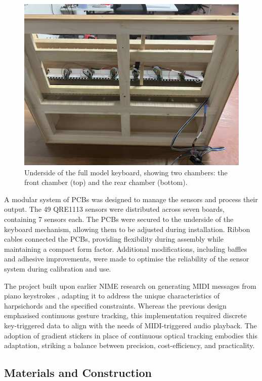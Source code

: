 \begin{figure}  
  \centering
  \includegraphics[width=\linewidth]{src/images/49-key-bottom-sensors-no-keys.jpg} 
  \caption{Underside of the full model keyboard, showing two chambers: the front chamber (top) and the rear chamber (bottom).} 
  \Description{} 
  \label{fig:49-key-bottom}
\end{figure}

A modular system of PCBs was designed to manage the sensors and process their output. The 49 QRE1113 sensors were distributed across seven boards, containing 7 sensors each. The PCBs were secured to the underside of the keyboard mechanism, allowing them to be adjusted during installation. Ribbon cables connected the PCBs, providing flexibility during assembly while maintaining a compact form factor. Additional modifications, including baffles and adhesive improvements, were made to optimise the reliability of the sensor system during calibration and use.


The project built upon earlier NIME research on generating MIDI messages from piano keystrokes \cite{McPherson2013}, adapting it to address the unique characteristics of harpsichords and the specified constraints. Whereas the previous design emphasised continuous gesture tracking, this implementation required discrete key-triggered data to align with the needs of MIDI-triggered audio playback. The adoption of gradient stickers in place of continuous optical tracking embodies this adaptation, striking a balance between precision, cost-efficiency, and practicality.


\subsection{Materials and Construction}

